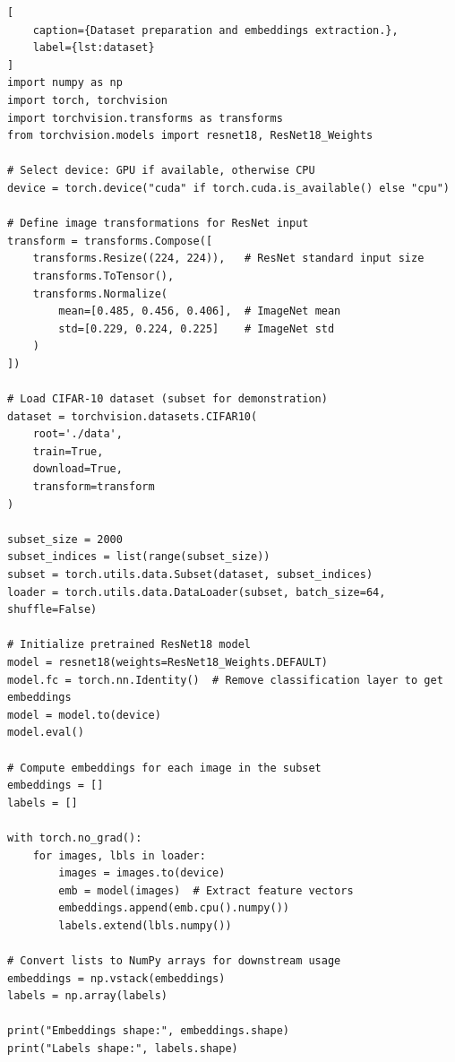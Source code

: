 \begin{lstlisting}[
    caption={Dataset preparation and embeddings extraction.},
    label={lst:dataset}
]
import numpy as np
import torch, torchvision
import torchvision.transforms as transforms
from torchvision.models import resnet18, ResNet18_Weights

# Select device: GPU if available, otherwise CPU
device = torch.device("cuda" if torch.cuda.is_available() else "cpu")

# Define image transformations for ResNet input
transform = transforms.Compose([
    transforms.Resize((224, 224)),   # ResNet standard input size
    transforms.ToTensor(),
    transforms.Normalize(
        mean=[0.485, 0.456, 0.406],  # ImageNet mean
        std=[0.229, 0.224, 0.225]    # ImageNet std
    )
])

# Load CIFAR-10 dataset (subset for demonstration)
dataset = torchvision.datasets.CIFAR10(
    root='./data',
    train=True,
    download=True,
    transform=transform
)

subset_size = 2000
subset_indices = list(range(subset_size))
subset = torch.utils.data.Subset(dataset, subset_indices)
loader = torch.utils.data.DataLoader(subset, batch_size=64, shuffle=False)

# Initialize pretrained ResNet18 model
model = resnet18(weights=ResNet18_Weights.DEFAULT)
model.fc = torch.nn.Identity()  # Remove classification layer to get embeddings
model = model.to(device)
model.eval()

# Compute embeddings for each image in the subset
embeddings = []
labels = []

with torch.no_grad():
    for images, lbls in loader:
        images = images.to(device)
        emb = model(images)  # Extract feature vectors
        embeddings.append(emb.cpu().numpy())
        labels.extend(lbls.numpy())

# Convert lists to NumPy arrays for downstream usage
embeddings = np.vstack(embeddings)
labels = np.array(labels)

print("Embeddings shape:", embeddings.shape)
print("Labels shape:", labels.shape)
\end{lstlisting}